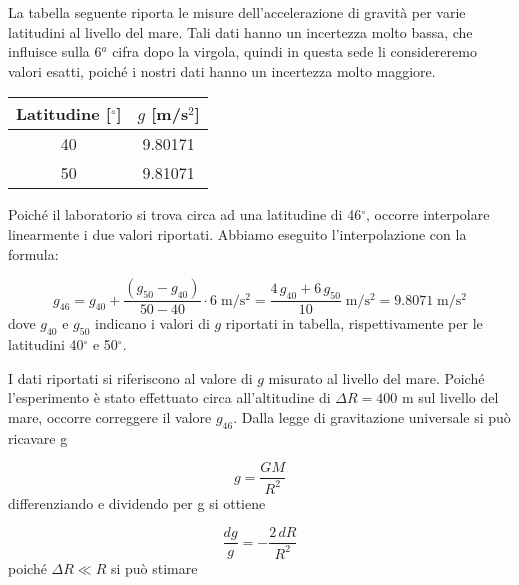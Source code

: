 
La tabella seguente riporta le misure dell'accelerazione di gravità
per varie latitudini al livello del mare. Tali dati hanno un incertezza molto bassa,
che influisce sulla 6$^a$ cifra dopo la virgola, quindi in questa sede li considereremo valori esatti,
poiché i nostri dati hanno un incertezza molto maggiore.

\begin{center}
    \begin{tabular}{c c}
        \toprule
        Latitudine [$^\circ$] & $g$ [m/s$^2$] \\
        \midrule
        40 & 9.80171 \\
        50 & 9.81071 \\
        \bottomrule
    \end{tabular}
\end{center}

Poiché il laboratorio si trova circa ad una latitudine di 46$^\circ$, occorre interpolare linearmente i due valori
riportati. Abbiamo eseguito l'interpolazione con la formula:

\begin{equation}
    g_{46} = g_{40} + \frac{(g_{50} - g_{40})}{50 - 40} \cdot 6 \; \si{\meter\per\square\second} =
    \frac{4\, g_{40} + 6\, g_{50}}{10} \; \si{\meter\per\square\second} =
    9.8071 \; \si{\meter\per\square\second}
    \label{eq:g46}
\end{equation}
%
dove $g_{40}$ e $g_{50}$ indicano i valori di $g$ riportati in tabella, rispettivamente per le latitudini 40$^\circ$ e 50$^\circ$.

I dati riportati si riferiscono al valore di $g$ misurato al livello del mare. Poiché l'esperimento è stato effettuato circa all'altitudine di
$\Delta R = 400$ m sul livello del mare, occorre correggere il valore $g_{46}$. Dalla legge di gravitazione universale si può ricavare g

\begin{equation}
    g = \frac{GM}{R^2}
\end{equation}
%
differenziando e dividendo per g si ottiene

\begin{equation}
    \frac{dg}{g} = - \frac{2\,dR}{R^2}
\end{equation}
%
poiché $\Delta R \ll R$ si può stimare

